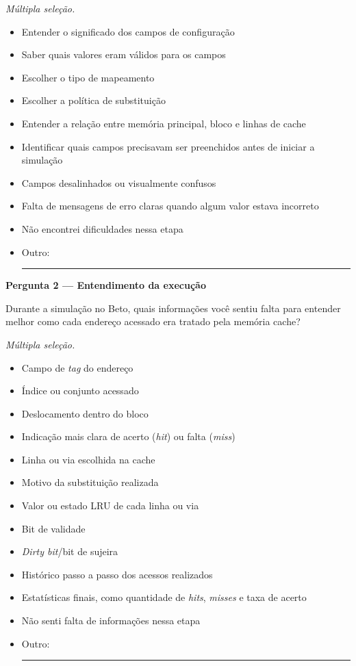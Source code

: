 \emph{Múltipla seleção.}
\begin{itemize}[label=\caixaOpcao]
\item Entender o significado dos campos de configuração
\item Saber quais valores eram válidos para os campos
\item Escolher o tipo de mapeamento
\item Escolher a política de substituição
\item Entender a relação entre memória principal, bloco e linhas de cache
\item Identificar quais campos precisavam ser preenchidos antes de iniciar a simulação
\item Campos desalinhados ou visualmente confusos
\item Falta de mensagens de erro claras quando algum valor estava incorreto
\item Não encontrei dificuldades nessa etapa
\item Outro: \rule{.65\linewidth}{.3pt}
\end{itemize}

\textbf{Pergunta 2 --- Entendimento da execução}\par
Durante a simulação no Beto, quais informações você sentiu falta para entender melhor como cada endereço acessado era tratado pela memória cache?

\emph{Múltipla seleção.}
\begin{itemize}[label=\caixaOpcao]
\item Campo de \textit{tag} do endereço
\item Índice ou conjunto acessado
\item Deslocamento dentro do bloco
\item Indicação mais clara de acerto (\textit{hit}) ou falta (\textit{miss})
\item Linha ou via escolhida na cache
\item Motivo da substituição realizada
\item Valor ou estado LRU de cada linha ou via
\item Bit de validade
\item \textit{Dirty bit}/bit de sujeira
\item Histórico passo a passo dos acessos realizados
\item Estatísticas finais, como quantidade de \textit{hits}, \textit{misses} e taxa de acerto
\item Não senti falta de informações nessa etapa
\item Outro: \rule{.65\linewidth}{.3pt}
\end{itemize}


